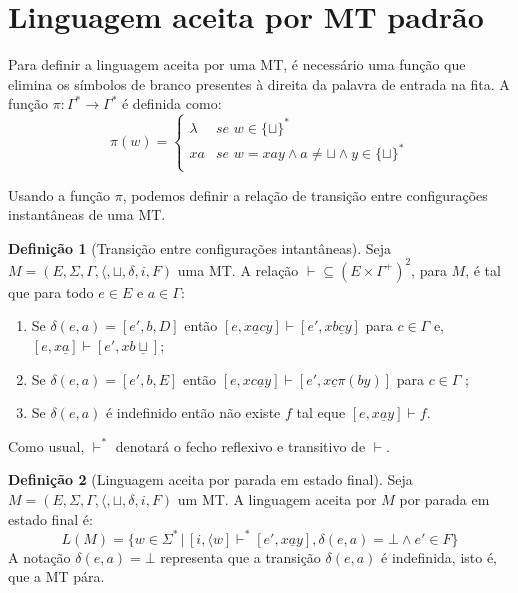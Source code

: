 \documentclass[a4paper]{article}
\theoremstyle{definition}
\newtheorem{Definition}{Definição}
\begin{document}
 \section{Linguagem aceita por MT padrão}
 
  Para definir a linguagem aceita por uma MT, é necessário uma função que
  elimina os símbolos de branco presentes à direita da palavra de entrada na
  fita. A função $\pi : \Gamma^* \to \Gamma^*$ é definida como:
  \[
    \pi(w) =\left\{  \begin{array}{ll}
                       \lambda & \textit{se } w \in \{\sqcup\}^*\\
                       xa      & \textit{se } w=xay \land a \neq \sqcup \land y \in \{\sqcup\}^*\\
                     \end{array}
             \right.
  \]

  
  Usando a função $\pi$, podemos definir a relação de transição entre
  configurações instantâneas de uma MT.

  \begin{Definition}[Transição entre configurações intantâneas]
    Seja $M = (E,\Sigma,\Gamma, \langle, \sqcup, \delta, i, F)$ uma MT. A
    relação $\vdash \subseteq (E \times \Gamma^+)^2$, para $M$, é tal que
    para todo $e \in E$ e $a \in \Gamma$:
    \begin{enumerate}
      \item Se $\delta(e,a) = [e',b,D]$ então $[e,x\underline{a}cy] \vdash
        [e',xb\underline{c}y]$ para $c \in \Gamma$ e,
        $[e,x\underline{a}]\vdash[e',xb\underline{\sqcup}]$;
      \item Se $\delta(e,a) = [e',b,E]$ então $[e,xc\underline{a}y] \vdash [e',
        x\underline{c}\pi(by)]$ para $c \in \Gamma$ ;
      \item Se $\delta(e,a)$ é indefinido então não existe $f$ tal eque
        $[e,x\underline{a}y] \vdash f$.
    \end{enumerate}
    Como usual, $\vdash^*$ denotará o fecho reflexivo e transitivo de $\vdash$.  
  \end{Definition}

  \begin{Definition}[Linguagem aceita por parada em estado final]
    Seja $M = (E,\Sigma,\Gamma,\langle, \sqcup, \delta, i, F)$ um MT. A
    linguagem aceita por $M$ por parada em estado final é:
    \[
      L(M) = \{w \in \Sigma^*\,|\,[i,\langle w] \vdash^* [e', x\underline{a}y],
      \delta(e,a) = \bot \land e' \in F\}
    \]
    A notação $\delta(e,a) = \bot$ representa que a transição $\delta(e,a)$ é
    indefinida, isto é, que a MT pára.
  \end{Definition}
\end{document}
